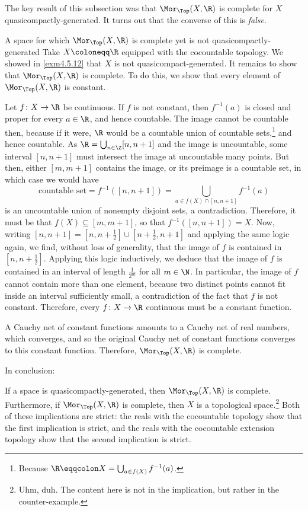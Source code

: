 The key result of this subsection was that $\Mor _{\Top}(X,\R )$ is complete for $X$ quasicompactly-generated.  It turns out that the converse of this is \emph{false}.
\begin{exm}{A space for which $\Mor _{\Top}(X,\R )$ is complete yet is not quasicompactly-generated}{}
Take $X\coloneqq \R$ equipped with the cocountable topology.  We showed in \cref{exm4.5.12} that $X$ is not quasicompact-generated.  It remains to show that $\Mor _{\Top}(X,\R )$ is complete.  To do this, we show that every element of $\Mor _{\Top}(X,\R )$ is constant.

Let $f\colon X\rightarrow \R$ be continuous.  If $f$ is not constant, then $f^{-1}(a)$ is closed and proper for every $a\in \R$, and hence countable.  The image cannot be countable then, because if it were, $\R$ would be a countable union of countable sets,\footnote{Because $\R \eqqcolon X=\bigcup _{a\in f(X)}f^{-1}(a)$.} and hence countable.  As $\R =\bigcup _{n\in \Z}[n,n+1]$ and the image is uncountable, some interval $[n,n+1]$ must intersect the image at uncountable many points.  But then, either $[m,m+1]$ contains the image, or its preimage is a countable set, in which case we would have
\begin{equation}
\text{countable set}=f^{-1}([n,n+1])=\bigcup _{a\in f(X)\cap [n,n+1]}f^{-1}(a)
\end{equation}
is an uncountable union of nonempty disjoint sets, a contradiction.  Therefore, it must be that $f(X)\subseteq [m,m+1]$, so that $f^{-1}([n,n+1])=X$.  Now, writing $[n,n+1]=[n,n+\frac{1}{2}]\cup [n+\frac{1}{2},n+1]$ and applying the same logic again, we find, without loss of generality, that the image of $f$ is contained in $[n,n+\frac{1}{2}]$.  Applying this logic inductively, we deduce that the image of $f$ is contained in an interval of length $\frac{1}{2^m}$ for all $m\in \N$.  In particular, the image of $f$ cannot contain more than one element, because two distinct points cannot fit inside an interval sufficiently small, a contradiction of the fact that $f$ is not constant.  Therefore, every $f\colon X\rightarrow \R$ continuous must be a constant function.

A Cauchy net of constant functions amounts to a Cauchy net of real numbers, which converges, and so the original Cauchy net of constant functions converges to this constant function.  Therefore, $\Mor _{\Top}(X,\R )$ is complete.
\end{exm}
In conclusion:
\begin{displayquote}
If a space is quasicompactly-generated, then $\Mor _{\Top}(X,\R )$ is complete.  Furthermore, if $\Mor _{\Top}(X,\R )$ is complete, then $X$ is a topological space.\footnote{Uhm, duh.  The content here is not in the implication, but rather in the counter-example.}  Both of these implications are strict:  the reals with the cocountable topology show that the first implication is strict, and the reals with the cocountable extension topology show that the second implication is strict.
\end{displayquote}

